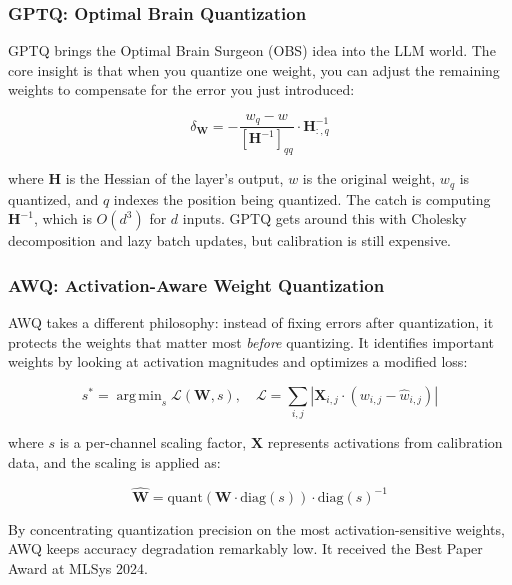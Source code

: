\documentclass[11pt,a4paper]{article}
\DeclareMathOperator*{\argmin}{arg\,min}
\begin{document}
\subsubsection{GPTQ: Optimal Brain Quantization}

GPTQ \cite{frantar2022gptq} brings the Optimal Brain Surgeon (OBS) idea \cite{lecun1990optimal} into the LLM world. The core insight is that when you quantize one weight, you can adjust the remaining weights to compensate for the error you just introduced:

\begin{equation}
\delta_{\mathbf{W}} = -\frac{w_q - w}{[\mathbf{H}^{-1}]_{qq}} \cdot \mathbf{H}^{-1}_{:,q}
\end{equation}

where $\mathbf{H}$ is the Hessian of the layer's output, $w$ is the original weight, $w_q$ is quantized, and $q$ indexes the position being quantized. The catch is computing $\mathbf{H}^{-1}$, which is $O(d^3)$ for $d$ inputs. GPTQ gets around this with Cholesky decomposition and lazy batch updates, but calibration is still expensive.

\subsubsection{AWQ: Activation-Aware Weight Quantization}

AWQ \cite{lin2023awq} takes a different philosophy: instead of fixing errors after quantization, it protects the weights that matter most \textit{before} quantizing. It identifies important weights by looking at activation magnitudes and optimizes a modified loss:

\begin{equation}
s^* = \argmin_{s} \mathcal{L}(\mathbf{W}, s), \quad \mathcal{L} = \sum_{i,j} \left| \mathbf{X}_{i,j} \cdot (w_{i,j} - \hat{w}_{i,j}) \right|
\end{equation}

where $s$ is a per-channel scaling factor, $\mathbf{X}$ represents activations from calibration data, and the scaling is applied as:

\begin{equation}
\hat{\mathbf{W}} = \text{quant}(\mathbf{W} \cdot \text{diag}(s)) \cdot \text{diag}(s)^{-1}
\end{equation}

By concentrating quantization precision on the most activation-sensitive weights, AWQ keeps accuracy degradation remarkably low. It received the Best Paper Award at MLSys 2024.
\end{document}
